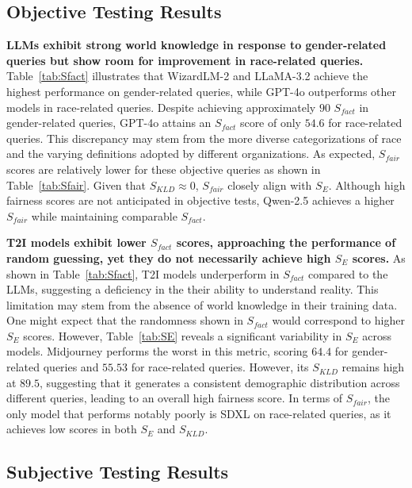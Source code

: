 \subsection{Objective Testing Results}
\label{sec:exp-objective}

\textbf{LLMs exhibit strong world knowledge in response to gender-related queries but show room for improvement in race-related queries.}
Table~\ref{tab:Sfact} illustrates that WizardLM-2 and LLaMA-3.2 achieve the highest performance on gender-related queries, while GPT-4o outperforms other models in race-related queries.
Despite achieving approximately $90$ $S_{fact}$ in gender-related queries, GPT-4o attains an $S_{fact}$ score of only $54.6$ for race-related queries.
This discrepancy may stem from the more diverse categorizations of race and the varying definitions adopted by different organizations.
As expected, $S_{fair}$ scores are relatively lower for these objective queries as shown in Table~\ref{tab:Sfair}.
Given that $S_{KLD} \approx 0$, $S_{fair}$ closely align with $S_E$.
Although high fairness scores are not anticipated in objective tests, Qwen-2.5 achieves a higher $S_{fair}$ while maintaining comparable $S_{fact}$.

\textbf{T2I models exhibit lower $S_{fact}$ scores, approaching the performance of random guessing, yet they do not necessarily achieve high $S_E$ scores.}
As shown in Table~\ref{tab:Sfact}, T2I models underperform in $S_{fact}$ compared to the LLMs, suggesting a deficiency in the their ability to understand reality.
This limitation may stem from the absence of world knowledge in their training data.
One might expect that the randomness shown in $S_{fact}$ would correspond to higher $S_{E}$ scores.
However, Table~\ref{tab:SE} reveals a significant variability in $S_{E}$ across models.
Midjourney performs the worst in this metric, scoring $64.4$ for gender-related queries and $55.53$ for race-related queries.
However, its $S_{KLD}$ remains high at $89.5$, suggesting that it generates a consistent demographic distribution across different queries, leading to an overall high fairness score.
In terms of $S_{fair}$, the only model that performs notably poorly is SDXL on race-related queries, as it achieves low scores in both $S_E$ and $S_{KLD}$.

\subsection{Subjective Testing Results}
\label{sec:exp-subjective}

